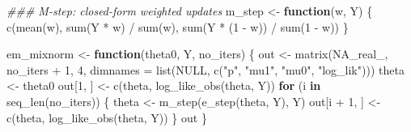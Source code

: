 \documentclass[
  letterpaper,
  DIV=11,
  numbers=noendperiod]{scrreprt}
\newenvironment{Shaded}{\begin{snugshade}}{\end{snugshade}}
\newcommand{\AttributeTok}[1]{\textcolor[rgb]{0.40,0.45,0.13}{#1}}
\newcommand{\ConstantTok}[1]{\textcolor[rgb]{0.56,0.35,0.01}{#1}}
\newcommand{\ControlFlowTok}[1]{\textcolor[rgb]{0.00,0.23,0.31}{\textbf{#1}}}
\newcommand{\DecValTok}[1]{\textcolor[rgb]{0.68,0.00,0.00}{#1}}
\newcommand{\DocumentationTok}[1]{\textcolor[rgb]{0.37,0.37,0.37}{\textit{#1}}}
\newcommand{\FunctionTok}[1]{\textcolor[rgb]{0.28,0.35,0.67}{#1}}
\newcommand{\NormalTok}[1]{\textcolor[rgb]{0.00,0.23,0.31}{#1}}
\newcommand{\OtherTok}[1]{\textcolor[rgb]{0.00,0.23,0.31}{#1}}
\newcommand{\SpecialCharTok}[1]{\textcolor[rgb]{0.37,0.37,0.37}{#1}}
\newcommand{\StringTok}[1]{\textcolor[rgb]{0.13,0.47,0.30}{#1}}
\begin{document}
\begin{Shaded}
\begin{Highlighting}[]
\DocumentationTok{\#\#\# M{-}step: closed{-}form weighted updates}
\NormalTok{m\_step }\OtherTok{\textless{}{-}} \ControlFlowTok{function}\NormalTok{(w, Y) \{}
    \FunctionTok{c}\NormalTok{(}\FunctionTok{mean}\NormalTok{(w),}
      \FunctionTok{sum}\NormalTok{(Y }\SpecialCharTok{*}\NormalTok{ w) }\SpecialCharTok{/} \FunctionTok{sum}\NormalTok{(w),}
      \FunctionTok{sum}\NormalTok{(Y }\SpecialCharTok{*}\NormalTok{ (}\DecValTok{1} \SpecialCharTok{{-}}\NormalTok{ w)) }\SpecialCharTok{/} \FunctionTok{sum}\NormalTok{(}\DecValTok{1} \SpecialCharTok{{-}}\NormalTok{ w))}
\NormalTok{\}}

\NormalTok{em\_mixnorm }\OtherTok{\textless{}{-}} \ControlFlowTok{function}\NormalTok{(theta0, Y, no\_iters) \{}
\NormalTok{    out }\OtherTok{\textless{}{-}} \FunctionTok{matrix}\NormalTok{(}\ConstantTok{NA\_real\_}\NormalTok{, no\_iters }\SpecialCharTok{+} \DecValTok{1}\NormalTok{, }\DecValTok{4}\NormalTok{,}
                  \AttributeTok{dimnames =} \FunctionTok{list}\NormalTok{(}\ConstantTok{NULL}\NormalTok{, }\FunctionTok{c}\NormalTok{(}\StringTok{"p"}\NormalTok{, }\StringTok{"mu1"}\NormalTok{, }\StringTok{"mu0"}\NormalTok{, }\StringTok{"log\_lik"}\NormalTok{)))}
\NormalTok{    theta }\OtherTok{\textless{}{-}}\NormalTok{ theta0}
\NormalTok{    out[}\DecValTok{1}\NormalTok{, ] }\OtherTok{\textless{}{-}} \FunctionTok{c}\NormalTok{(theta, }\FunctionTok{log\_like\_obs}\NormalTok{(theta, Y))}
    \ControlFlowTok{for}\NormalTok{ (i }\ControlFlowTok{in} \FunctionTok{seq\_len}\NormalTok{(no\_iters)) \{}
\NormalTok{        theta }\OtherTok{\textless{}{-}} \FunctionTok{m\_step}\NormalTok{(}\FunctionTok{e\_step}\NormalTok{(theta, Y), Y)}
\NormalTok{        out[i }\SpecialCharTok{+} \DecValTok{1}\NormalTok{, ] }\OtherTok{\textless{}{-}} \FunctionTok{c}\NormalTok{(theta, }\FunctionTok{log\_like\_obs}\NormalTok{(theta, Y))}
\NormalTok{    \}}
\NormalTok{    out}
\NormalTok{\}}
\end{Highlighting}
\end{Shaded}
\end{document}
